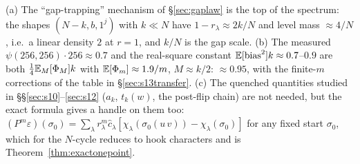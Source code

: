 \begin{remark}
(a) The ``gap-trapping'' mechanism of \S\ref{sec:gaplaw} is the top
of the spectrum: the shapes $(N-k,b,1^j)$ with $k\ll N$ have
$1-r_\lambda\approx2k/N$ and level mass $\approx4/N$, i.e.\ a
linear density $2$ at $r=1$, and $k/N$ is the gap scale.  (b) The
measured $\psi(256,256)\cdot256\approx0.7$ and the real-square
constant $\mathbb{E}[\mathrm{bias}^2]k\approx0.7$--$0.9$ are both
$\tfrac14\mathbb{E}_M[\Phi_M]k$ with $\mathbb{E}[\Phi_m]\approx1.9/m$, $M\approx k/2$:
$\approx0.95$, with the finite-$m$ corrections of the table in
\S\ref{sec:s13transfer}.  (c) The quenched quantities studied in
\S\S\ref{sec:s10}--\ref{sec:s12} ($a_k$, $t_k(w)$, the post-flip
chain) are not needed, but the exact formula gives a handle on them
too: $(P^m\varepsilon)(\sigma_0)=\sum_\lambda r_\lambda^m\hat c_\lambda
[\chi_\lambda(\sigma_0(u\,v))-\chi_\lambda(\sigma_0)]$ for any fixed
start $\sigma_0$, which for the $N$-cycle reduces to hook characters
and is Theorem~\ref{thm:exactonepoint}.
\end{remark}
